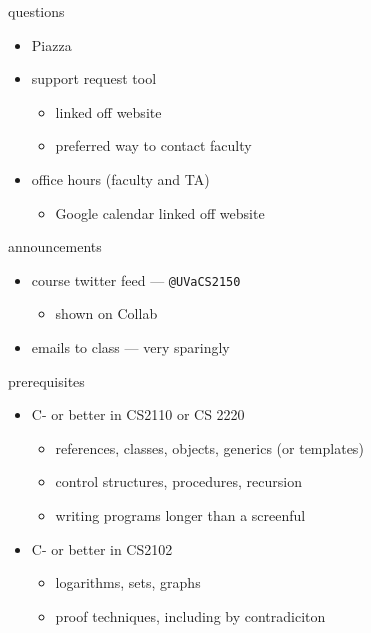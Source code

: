 \begin{frame}{questions}
    \begin{itemize}
    \item Piazza 
    \item support request tool
        \begin{itemize}
        \item linked off website
        \item preferred way to contact faculty
        \end{itemize}
    \item office hours (faculty and TA)
        \begin{itemize}
        \item Google calendar linked off website
        \end{itemize}
    \end{itemize}
\end{frame}

\begin{frame}{announcements}
    \begin{itemize}
    \item course twitter feed --- \texttt{@UVaCS2150}
        \begin{itemize}
            \item shown on Collab
        \end{itemize}
    \item emails to class --- very sparingly
    \end{itemize}
\end{frame}

\begin{frame}{prerequisites}
    \begin{itemize}
        \item C- or better in CS2110 or CS 2220
            \begin{itemize}
            \item references, classes, objects, generics (or templates)
            \item control structures, procedures, recursion
            \item writing programs longer than a screenful
            \end{itemize}
        \item C- or better in CS2102
            \begin{itemize}
            \item logarithms, sets, graphs
            \item proof techniques, including by contradiciton
            \end{itemize}
    \end{itemize}
\end{frame}

